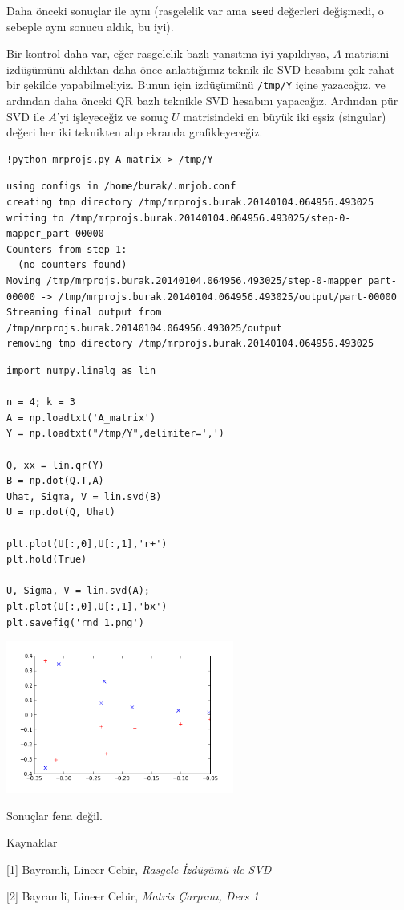 \documentclass[12pt,fleqn]{article}\usepackage{../../common}
\begin{document}
Daha önceki sonuçlar ile aynı (rasgelelik var ama \verb!seed!
değerleri değişmedi, o sebeple aynı sonucu aldık, bu iyi).

Bir kontrol daha var, eğer rasgelelik bazlı yansıtma iyi yapıldıysa, $A$
matrisini izdüşümünü aldıktan daha önce anlattığımız teknik ile SVD
hesabını çok rahat bir şekilde yapabilmeliyiz. Bunun için izdüşümünü
\verb!/tmp/Y! içine yazacağız, ve ardından daha önceki QR bazlı
teknikle SVD hesabını yapacağız. Ardından pür SVD ile $A$'yi işleyeceğiz ve
sonuç $U$ matrisindeki en büyük iki eşsiz (singular) değeri her iki
teknikten alıp ekranda grafikleyeceğiz.

\begin{verbatim}
!python mrprojs.py A_matrix > /tmp/Y
\end{verbatim}

\begin{verbatim}
using configs in /home/burak/.mrjob.conf
creating tmp directory /tmp/mrprojs.burak.20140104.064956.493025
writing to /tmp/mrprojs.burak.20140104.064956.493025/step-0-mapper_part-00000
Counters from step 1:
  (no counters found)
Moving /tmp/mrprojs.burak.20140104.064956.493025/step-0-mapper_part-00000 -> /tmp/mrprojs.burak.20140104.064956.493025/output/part-00000
Streaming final output from /tmp/mrprojs.burak.20140104.064956.493025/output
removing tmp directory /tmp/mrprojs.burak.20140104.064956.493025
\end{verbatim}

\begin{verbatim}
import numpy.linalg as lin

n = 4; k = 3
A = np.loadtxt('A_matrix')
Y = np.loadtxt("/tmp/Y",delimiter=',')

Q, xx = lin.qr(Y)
B = np.dot(Q.T,A)
Uhat, Sigma, V = lin.svd(B)
U = np.dot(Q, Uhat)

plt.plot(U[:,0],U[:,1],'r+')
plt.hold(True)

U, Sigma, V = lin.svd(A);
plt.plot(U[:,0],U[:,1],'bx')
plt.savefig('rnd_1.png')
\end{verbatim}

\includegraphics[height=5cm]{rnd_1.png}

Sonuçlar fena değil.

Kaynaklar

[1] Bayramli, Lineer Cebir, {\em Rasgele İzdüşümü ile SVD}

[2] Bayramli, Lineer Cebir, {\em Matris Çarpımı, Ders 1}
\end{document}
